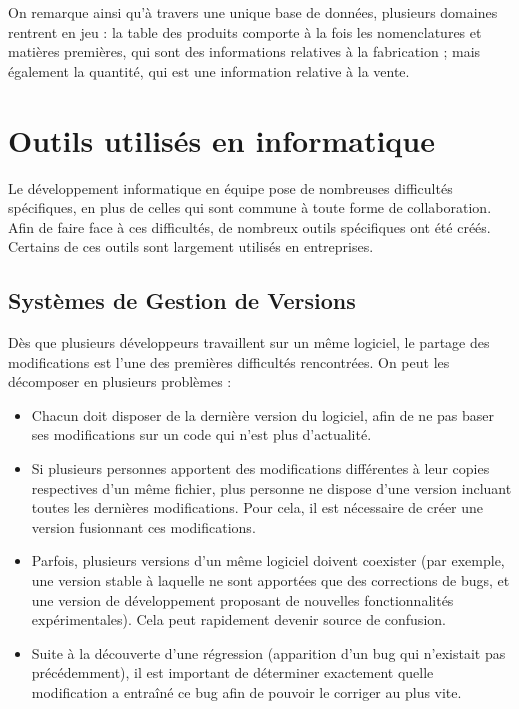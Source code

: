 On remarque ainsi qu'à travers une unique base de données, plusieurs domaines rentrent en jeu : la table des produits comporte à la fois les nomenclatures et matières premières, qui sont des informations relatives à la fabrication ; mais également la quantité, qui est une information relative à la vente.

\section{Outils utilisés en informatique}

Le développement informatique en équipe pose de nombreuses difficultés spécifiques, en plus de celles qui sont commune à toute forme de collaboration. Afin de faire face à ces difficultés, de nombreux outils spécifiques ont été créés. Certains de ces outils sont largement utilisés en entreprises.

\subsection{Systèmes de Gestion de Versions}

Dès que plusieurs développeurs travaillent sur un même logiciel, le partage des modifications est l'une des premières difficultés rencontrées. On peut les décomposer en plusieurs problèmes :

\begin{itemize}
\item Chacun doit disposer de la dernière version du logiciel, afin de ne pas baser ses modifications sur un code qui n’est plus d’actualité.
\item Si plusieurs personnes apportent des modifications différentes à leur copies respectives d’un même fichier, plus personne ne dispose d’une version incluant toutes les dernières modifications. Pour cela, il est nécessaire de créer une version fusionnant ces modifications.
\item Parfois, plusieurs versions d’un même logiciel doivent coexister (par exemple, une version stable à laquelle ne sont apportées que des corrections de bugs, et une version de développement proposant de nouvelles fonctionnalités expérimentales). Cela peut rapidement devenir source de confusion.
\item Suite à la découverte d’une régression (apparition d’un bug qui n’existait pas précédemment), il est important de déterminer exactement quelle modification a entraîné ce bug afin de pouvoir le corriger au plus vite.
\end{itemize}

